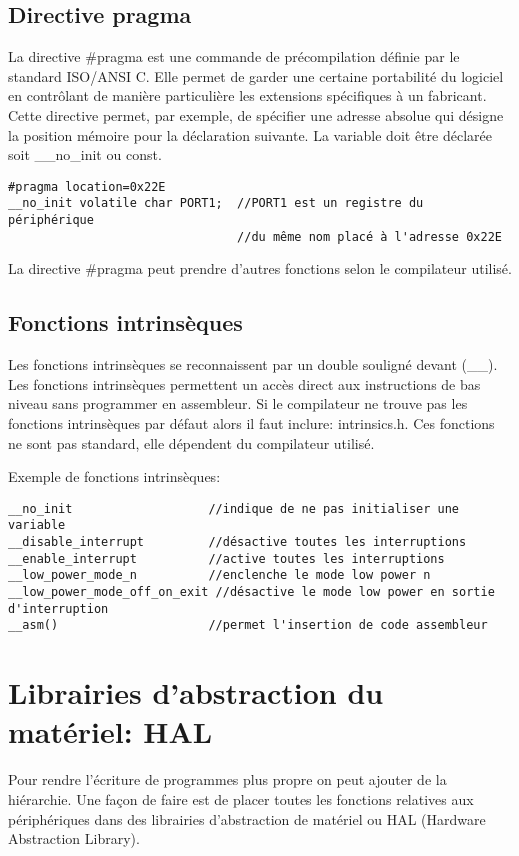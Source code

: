 \subsection{Directive pragma}
La directive \#pragma est une commande de précompilation définie par le standard ISO/ANSI C. Elle permet de garder une certaine portabilité du logiciel en contrôlant de manière particulière les extensions spécifiques à un fabricant. Cette directive permet, par exemple, de spécifier une adresse absolue qui désigne la position mémoire pour la déclaration suivante. La variable doit être déclarée soit \_\_no\_init ou const. 

\lstset{style=customc}
\begin{lstlisting}
#pragma location=0x22E
__no_init volatile char PORT1;	//PORT1 est un registre du périphérique
                                //du même nom placé à l'adresse 0x22E
\end{lstlisting}
La directive \#pragma peut prendre d'autres fonctions selon le compilateur utilisé.

\subsection{Fonctions intrinsèques}
Les fonctions intrinsèques se reconnaissent par un double souligné devant (\_\_). Les fonctions intrinsèques permettent un accès direct aux instructions de bas niveau sans programmer en assembleur. Si le compilateur ne trouve pas les fonctions intrinsèques par défaut alors il faut inclure: intrinsics.h. Ces fonctions ne sont pas standard, elle dépendent du compilateur utilisé.

Exemple de fonctions intrinsèques:
\lstset{style=customc}
\begin{lstlisting}
__no_init					//indique de ne pas initialiser une variable
__disable_interrupt			//désactive toutes les interruptions
__enable_interrupt			//active toutes les interruptions
__low_power_mode_n			//enclenche le mode low power n
__low_power_mode_off_on_exit //désactive le mode low power en sortie d'interruption
__asm()						//permet l'insertion de code assembleur
\end{lstlisting}


\section{Librairies d'abstraction du matériel: HAL}
Pour rendre l'écriture de programmes plus propre on peut ajouter de la hiérarchie. Une façon de faire est de placer toutes les fonctions relatives aux périphériques dans des librairies d'abstraction de matériel ou HAL (Hardware Abstraction Library).

